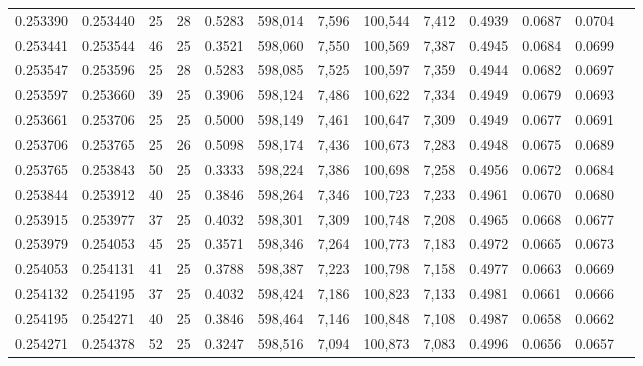 \begin{tabular}{rrrrrrrrrrrrr}
0.253390 & 0.253440 &    25 &  28 &                                     0.5283 & 598,014 &   7,596 & 100,544 &   7,412 & 0.4939 & 0.0687 & 0.0704 \\
0.253441 & 0.253544 &    46 &  25 &                                     0.3521 & 598,060 &   7,550 & 100,569 &   7,387 & 0.4945 & 0.0684 & 0.0699 \\
0.253547 & 0.253596 &    25 &  28 &                                     0.5283 & 598,085 &   7,525 & 100,597 &   7,359 & 0.4944 & 0.0682 & 0.0697 \\
0.253597 & 0.253660 &    39 &  25 &                                     0.3906 & 598,124 &   7,486 & 100,622 &   7,334 & 0.4949 & 0.0679 & 0.0693 \\
0.253661 & 0.253706 &    25 &  25 &                                     0.5000 & 598,149 &   7,461 & 100,647 &   7,309 & 0.4949 & 0.0677 & 0.0691 \\
0.253706 & 0.253765 &    25 &  26 &                                     0.5098 & 598,174 &   7,436 & 100,673 &   7,283 & 0.4948 & 0.0675 & 0.0689 \\
0.253765 & 0.253843 &    50 &  25 &                                     0.3333 & 598,224 &   7,386 & 100,698 &   7,258 & 0.4956 & 0.0672 & 0.0684 \\
0.253844 & 0.253912 &    40 &  25 &                                     0.3846 & 598,264 &   7,346 & 100,723 &   7,233 & 0.4961 & 0.0670 & 0.0680 \\
0.253915 & 0.253977 &    37 &  25 &                                     0.4032 & 598,301 &   7,309 & 100,748 &   7,208 & 0.4965 & 0.0668 & 0.0677 \\
0.253979 & 0.254053 &    45 &  25 &                                     0.3571 & 598,346 &   7,264 & 100,773 &   7,183 & 0.4972 & 0.0665 & 0.0673 \\
0.254053 & 0.254131 &    41 &  25 &                                     0.3788 & 598,387 &   7,223 & 100,798 &   7,158 & 0.4977 & 0.0663 & 0.0669 \\
0.254132 & 0.254195 &    37 &  25 &                                     0.4032 & 598,424 &   7,186 & 100,823 &   7,133 & 0.4981 & 0.0661 & 0.0666 \\
0.254195 & 0.254271 &    40 &  25 &                                     0.3846 & 598,464 &   7,146 & 100,848 &   7,108 & 0.4987 & 0.0658 & 0.0662 \\
0.254271 & 0.254378 &    52 &  25 &                                     0.3247 & 598,516 &   7,094 & 100,873 &   7,083 & 0.4996 & 0.0656 & 0.0657 \\

\end{tabular}
